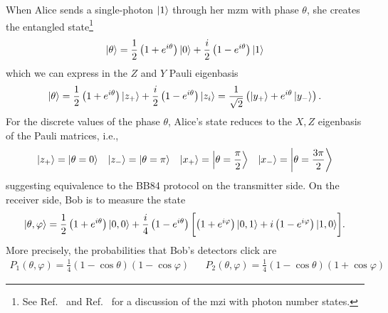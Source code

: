 \cite{Bennett1992} %


When Alice sends a single-photon $\ket{1}$ through her \gls{mzm} with phase $\theta$, she creates the entangled state\footnote{See Ref.~\cite[p.~137]{Haroche2006} and Ref.~\cite[p.~143]{Gerry2005} for a discussion of the \gls{mzi} with photon number states.}
\begin{equation}
	\ket{\theta}
	=
	\frac{1}{2}
	\left(1+e^{i\theta}\right)
	\ket{0}
	+
	\frac{i}{2}
	\left(1-e^{i\theta}\right)
	\ket{1}
\end{equation}
which we can express in the $Z$ and $Y$ Pauli eigenbasis
\begin{equation}
	\begin{split}
		\ket{\theta}
		=
		\frac{1}{2}
		\left(1+e^{i\theta}\right)
		\ket{z_+}
		+
		\frac{i}{2}
		\left(1-e^{i\theta}\right)
		\ket{z_i}
		=
		\frac{1}{\sqrt{2}}
		\left(
			\ket{y_+}
			+
			e^{i\theta}
			\ket{y_-}
		\right)
		.
	\end{split}
\end{equation}
For the discrete values of the phase $\theta$, Alice's state reduces to the $X,Z$ eigenbasis of the Pauli matrices, i.e.,
\begin{align}
	\ket{z_+}
	=
	\ket{\theta=0}
	&&
	\ket{z_-}
	=
	\ket{\theta=\pi}
	&&
	\ket{x_+}
	=
	\ket{\theta=\frac{\pi}{2}}
	&&
	\ket{x_-}
	=
	\ket{\theta=\frac{3\pi}{2}}
\end{align}
suggesting equivalence to the BB84 protocol on the transmitter side.
On the receiver side, Bob is to measure the state
\begin{equation}
	\ket{\theta,\varphi}
	=
	\frac{1}{2}
	\left(1+e^{i\theta}\right)
	\ket{0,0}
	+
	\frac{i}{4}
	\left(1-e^{i\theta}\right)
	\biggl[
		\left(1+e^{i\varphi}\right)
		\ket{0,1}
		+
		i\left(1-e^{i\varphi}\right)
		\ket{1,0}
	\biggr]
	.
\end{equation}
More precisely, the probabilities that Bob's detectors click are
\begin{align}
	P_1(\theta,\varphi)
	=
	\frac{1}{4}
	\left(1-\cos\theta\right)
	\left(1-\cos\varphi\right)
	&&
	P_2(\theta,\varphi)
	=
	\frac{1}{4}
	\left(1-\cos\theta\right)
	\left(1+\cos\varphi\right)
\end{align}
